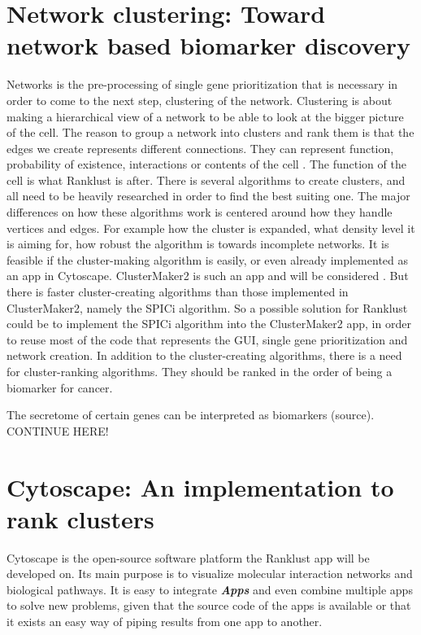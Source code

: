 \documentclass[UKenglish]{ifimaster}
\begin{document}
\chapter{Network clustering: Toward network based biomarker discovery}
Networks is the pre-processing of single gene prioritization that is necessary in order to come to the next step,
clustering of the network. Clustering is about making a hierarchical view of a network to be able to look at the bigger
picture of the cell. The reason to group a network into clusters and rank them is that the edges we create represents
different connections. They can represent function, probability of existence, interactions or contents of the cell
\cite{siri}. The function of the cell is what Ranklust is after. There is several algorithms to create clusters, and all
need to be heavily researched in order to find the best suiting one. The major differences on how these algorithms work
is centered around how they handle vertices and edges. For example how the cluster is expanded, what density level it is
aiming for, how robust the algorithm is towards incomplete networks. It is feasible if the cluster-making algorithm is
easily, or even already implemented as an app in Cytoscape. ClusterMaker2 is such an app and will be considered
\cite{cm2}. But there is faster cluster-creating algorithms than those implemented in ClusterMaker2, namely the SPICi
\cite{spici} algorithm. So a possible solution for Ranklust could be to implement the SPICi algorithm into the
ClusterMaker2 app, in order to reuse most of the code that represents the GUI, single gene prioritization and network
creation. In addition to the cluster-creating algorithms, there is a need for cluster-ranking algorithms. They should be
ranked in the order of being a biomarker for cancer.


The secretome of certain genes can be interpreted as biomarkers (source). CONTINUE HERE!

\chapter{Cytoscape: An implementation to rank clusters}
Cytoscape is the open-source software platform the Ranklust app will be developed on. Its main purpose is to visualize
molecular interaction networks and biological pathways.  It is easy to integrate \textbf{\textit{Apps}} and even combine 
multiple apps to solve new problems, given that the source code of the apps is available or that it exists an easy way of 
piping results from one app to another. 
\end{document}

